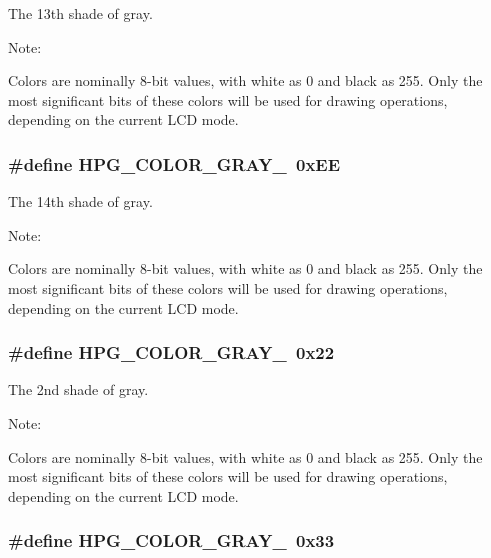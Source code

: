 The 13th shade of gray.

\begin{Desc}
\item[Note: ]\par
Colors are nominally 8-bit values, with white as 0 and black as 255. Only the most significant bits of these colors will be used for drawing operations, depending on the current LCD mode. \end{Desc}
\subsubsection{\setlength{\rightskip}{0pt plus 5cm}\#define HPG\_\-COLOR\_\-GRAY\_\ 0x\-EE}\label{hpgraphics_8h_a16}


The 14th shade of gray.

\begin{Desc}
\item[Note: ]\par
Colors are nominally 8-bit values, with white as 0 and black as 255. Only the most significant bits of these colors will be used for drawing operations, depending on the current LCD mode. \end{Desc}
\subsubsection{\setlength{\rightskip}{0pt plus 5cm}\#define HPG\_\-COLOR\_\-GRAY\_\ 0x22}\label{hpgraphics_8h_a4}


The 2nd shade of gray.

\begin{Desc}
\item[Note: ]\par
Colors are nominally 8-bit values, with white as 0 and black as 255. Only the most significant bits of these colors will be used for drawing operations, depending on the current LCD mode. \end{Desc}
\subsubsection{\setlength{\rightskip}{0pt plus 5cm}\#define HPG\_\-COLOR\_\-GRAY\_\ 0x33}\label{hpgraphics_8h_a5}


